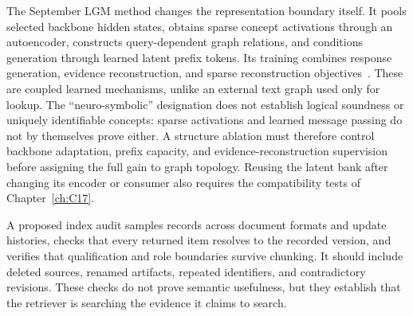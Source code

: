 The September LGM method changes the representation boundary itself. It pools selected backbone hidden states, obtains sparse concept activations through an autoencoder, constructs query-dependent graph relations, and conditions generation through learned latent prefix tokens. Its training combines response generation, evidence reconstruction, and sparse reconstruction objectives~\cite{cumb2026lgmv2}. These are coupled learned mechanisms, unlike an external text graph used only for lookup. The ``neuro-symbolic'' designation does not establish logical soundness or uniquely identifiable concepts: sparse activations and learned message passing do not by themselves prove either. A structure ablation must therefore control backbone adaptation, prefix capacity, and evidence-reconstruction supervision before assigning the full gain to graph topology. Reusing the latent bank after changing its encoder or consumer also requires the compatibility tests of Chapter~\ref{ch:C17}.

A proposed index audit samples records across document formats and update histories, checks that every returned item resolves to the recorded version, and verifies that qualification and role boundaries survive chunking. It should include deleted sources, renamed artifacts, repeated identifiers, and contradictory revisions. These checks do not prove semantic usefulness, but they establish that the retriever is searching the evidence it claims to search.

